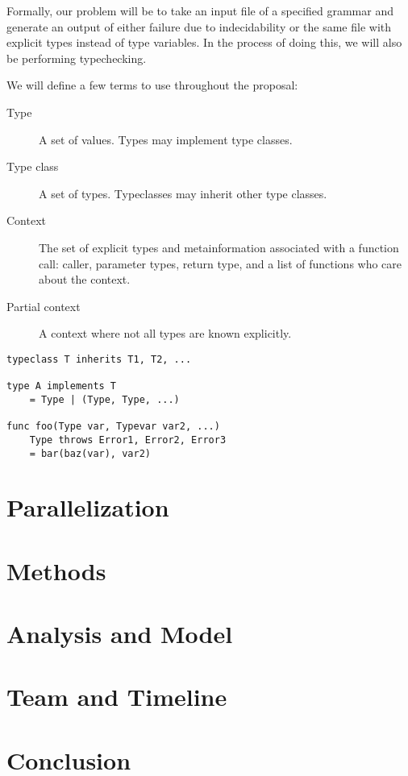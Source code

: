 \documentclass{acm_proc_article-sp}
\begin{document}

Formally, our problem will be to take an input file of a specified grammar and
generate an output of either failure due to indecidability or the same file
with explicit types instead of type variables. In the process of doing this, we
will also be performing typechecking. 

We will define a few terms to use throughout the proposal:

\begin{description}
	\item[Type] A set of values. Types may implement type classes.
	\item[Type class] A set of types. Typeclasses may inherit other type classes.
	\item[Context] The set of explicit types and metainformation associated
		with a function call: caller, parameter types, return type,
		and a list of functions who care about the context.
	\item[Partial context] A context where not all types are known explicitly.
\end{description}

\begin{lstlisting}[caption=Grammar displayed informally,style=paratype]
typeclass T inherits T1, T2, ...

type A implements T
    = Type | (Type, Type, ...)

func foo(Type var, Typevar var2, ...)
    Type throws Error1, Error2, Error3
    = bar(baz(var), var2)
\end{lstlisting}

\section{Parallelization}


\section{Methods}


\section{Analysis and Model}


\section{Team and Timeline}

\section{Conclusion}


\end{document}
